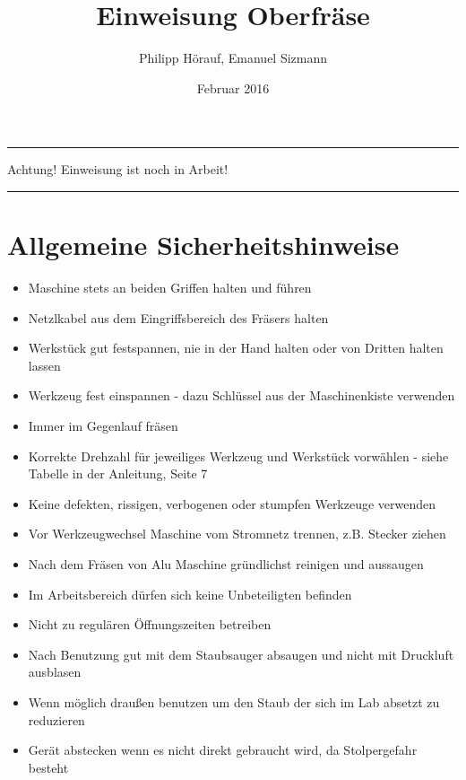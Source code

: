 \documentclass{\basedir/fablab-document}
\date{Februar 2016}
\author{Philipp Hörauf, Emanuel Sizmann}
\title{Einweisung Oberfräse}
\begin{document}
\dosecttoc
\faketableofcontents
{}

\color{red}
\hrule
\begin{center}
\large{Achtung! Einweisung ist noch in Arbeit!}
\vspace{0.1cm}
\end{center}
\hrule
\color{black}

\section[Allgemeine Sicherheitshinweise]{Allgemeine Sicherheitshinweise}
\begin{itemize}
\item Maschine stets an beiden Griffen halten und führen
\item Netzlkabel aus dem Eingriffsbereich des Fräsers halten
\item Werkstück gut festspannen, nie in der Hand halten oder von Dritten halten lassen
\item Werkzeug fest einspannen - dazu Schlüssel aus der Maschinenkiste verwenden
\item Immer im Gegenlauf fräsen
\item Korrekte Drehzahl für jeweiliges Werkzeug und Werkstück vorwählen - siehe Tabelle in der Anleitung, Seite 7
\item Keine defekten, rissigen, verbogenen oder stumpfen Werkzeuge verwenden
\item Vor Werkzeugwechsel Maschine vom Stromnetz trennen, z.B. Stecker ziehen
\item Nach dem Fräsen von Alu Maschine gründlichst reinigen und aussaugen
\item Im Arbeitsbereich dürfen sich keine Unbeteiligten befinden
\item Nicht zu regulären Öffnungszeiten betreiben
\item Nach Benutzung gut mit dem Staubsauger absaugen und nicht mit Druckluft ausblasen
\item Wenn möglich draußen benutzen um den Staub der sich im Lab absetzt zu reduzieren
\item Gerät abstecken wenn es nicht direkt gebraucht wird, da Stolpergefahr besteht
\end{itemize}
\end{document}
